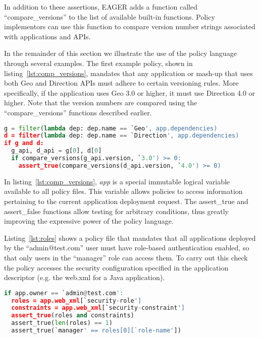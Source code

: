 In addition to these assertions, EAGER adds a function
called ``compare\_versions'' to the list 
of available built-in functions. Policy
implementors can use this function to compare version 
number strings associated with
applications and APIs.


In the remainder of this section we illustrate the use of the policy language
through several examples.
The first example policy, shown in listing~\ref{lst:comp_versions}, 
mandates that any application or mash-up
that uses both Geo and Direction APIs must adhere to certain versioning 
rules. More specifically, if the application uses Geo 3.0 or higher, it must use
Direction 4.0 or higher. Note that the version numbers are compared using the
``compare\_versions'' functions described earlier.

{\footnotesize
\begin{lstlisting}[language=Python, frame=single, showstringspaces=false,
caption={Enforcing API version comparison}, label={lst:comp_versions}]
g = filter(lambda dep: dep.name == `Geo', app.dependencies)
d = filter(lambda dep: dep.name == `Direction', app.dependencies)
if g and d:
  g_api, d_api = g[0], d[0]
  if compare_versions(g_api.version, `3.0') >= 0:
    assert_true(compare_versions(d_api.version, `4.0') >= 0)
\end{lstlisting}
}

In listing~\ref{lst:comp_versions}, \textit{app} is a special immutable logical variable available to
all policy files. This variable allows policies to access information
pertaining to the current application deployment request. The assert\_true and assert\_false
functions allow testing for arbitrary conditions, thus greatly improving the expressive
power of the policy language.

Listing~\ref{lst:roles} shows a policy file that mandates that all applications deployed
by the ``admin@test.com'' user must have role-based authentication enabled, so that only
users in the ``manager'' role can access them. To carry out this check the policy accesses
the security configuration specified in the application descriptor (e.g. the
web.xml for a Java application).

{\footnotesize
\begin{lstlisting}[language=Python, frame=single, showstringspaces=false, 
caption={Enforcing role-based authorization.}, label={lst:roles}]
if app.owner == `admin@test.com':
  roles = app.web_xml[`security-role']
  constraints = app.web_xml[`security-constraint']
  assert_true(roles and constraints)
  assert_true(len(roles) == 1)
  assert_true(`manager' == roles[0][`role-name'])
\end{lstlisting}
}

